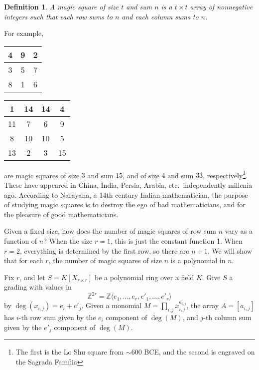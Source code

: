 \documentclass[11pt]{book}
\newtheorem{definition}[theorem]{Definition}
\numberwithin{equation}{section}
\numberwithin{theorem}{chapter}
\theoremstyle{definition}
\newtheorem*{basic properties}{Basic Properties}
\newtheorem*{Important Remark}{Important Remark}
\theoremstyle{remark}
\newcommand{\ZZ}{\mathbb{Z}}
\begin{document}
\begin{definition}
	A \emph{magic square} of size $t$ and sum $n$ is a $t\times t$ array of nonnegative integers such that each row sums to $n$ and each column sums to $n$.
	\end{definition}
For example,
\begin{center}
	\begin{tabular}{ | c | c | c |}
		\hline
		4 & 9 & 2 \\ \hline
		3 & 5 & 7 \\ \hline
		8 & 1 & 6 \\
		\hline
	\end{tabular} \qquad \qquad
\begin{tabular}{ |c |c| c| c|}
	\hline
1&	14&	14&	4\\ \hline
11&	7&	6&	9\\ \hline
8&	10&	10&	5\\ \hline
13&	2&	3&	15\\ \hline
\end{tabular}
\end{center}
are magic squares of size $3$ and sum $15$, and of size $4$ and sum $33$, respectively\footnote{The first is the Lo Shu square from $\sim 600$ BCE, and the second is engraved on the Sagrada Fam\'ilia}. These have appeared in China, India, Persia, Arabia, etc.~independently millenia ago. According to Narayana, a 14th century Indian mathematician, the purpose of studying magic squares is to destroy the ego of bad mathematicians, and for the pleasure of good mathematicians.

 Given a fixed size, how does the number of magic squares of row sum $n$ vary as a function of $n$? When the size $r=1$, this is just the constant function 1. When $r=2$, everything is determined by the first row, so there are $n+1$. We will show that for each $r$, the number of magic squares of size $n$ is a polynomial in $n$.
 
 Fix $r$, and let $S=K[X_{r\times r}]$ be a polynomial ring over a field $K$. Give $S$ a grading with values in \[\ZZ^{2r}=\ZZ\langle e_1,\dots,e_{r},e'_1,\dots,e'_{r}\rangle\] by $\deg(x_{i,j})=e_i + e'_j$. Given a monomial $M=\prod_{i,j} x_{i,j}^{a_{i,j}}$, the array $A=[a_{i,j}]$ has $i$-th row sum given by the $e_i$ component of $\deg(M)$, and $j$-th column sum given by the $e'_j$ component of $\deg(M)$.
\end{document}
